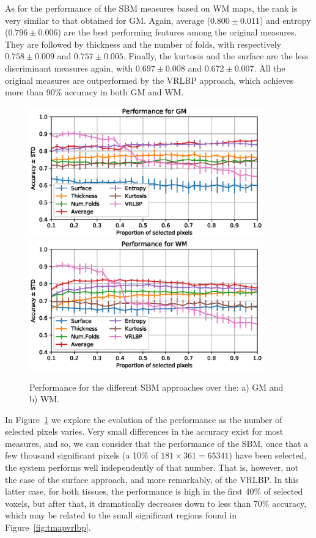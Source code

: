 As for the performance of the \ac{SBM} measures based on \ac{WM} maps, the rank is very similar to that obtained for \ac{GM}. Again, average ($0.800 \pm 0.011$) and entropy ($0.796 \pm 0.006$) are the best performing features among the original measures. They are followed by thickness and the number of folds, with respectively $0.758 \pm 0.009$ and $0.757 \pm 0.005$. Finally, the kurtosis and the surface are the less discriminant measures again, with $0.697 \pm 0.008$ and $0.672 \pm 0.007$. All the original measures are outperformed by the \ac{VRLBP} approach, which achieves more than 90\% accuracy in both \ac{GM} and \ac{WM}. 

\begin{figure}[htp]
	\myfloatalign
	\includegraphics[width=0.9\textwidth]{Graphics/ch6/GMperformanceComp}\\
	\includegraphics[width=0.9\textwidth]{Graphics/ch6/WMperformanceComp}
	\caption{Performance for the different \ac{SBM} approaches over the: a) \acs{GM} and b) \acs{WM}.}
	\label{fig:figureGM}
\end{figure}

In Figure~\ref{fig:figureGM} we explore the evolution of the performance as the number of selected pixels varies. Very small differences in the accuracy exist for most measures, and so, we can consider that the performance of the \ac{SBM}, once that a few thousand significant pixels (a 10\% of $181\times361=65341$) have been selected, the system performs well independently of that number. That is, however, not the case of the surface approach, and more remarkably, of the \ac{VRLBP}. In this latter case, for both tissues, the performance is high in the first 40\% of selected voxels, but after that, it dramatically decreases down to less than 70\% accuracy, which may be related to the small significant regions found in Figure~\ref{fig:tmapvrlbp}.

